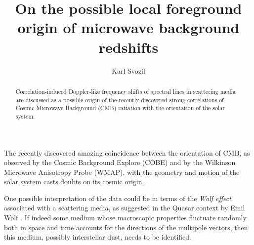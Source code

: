 \documentclass[prl,amsfonts,showpacs,showkeys]{revtex4}
\begin{document}



\title{On the possible local foreground origin of microwave background redshifts}

\author{Karl Svozil}


\begin{abstract}
Correlation-induced Doppler-like frequency shifts of spectral lines
in scattering media are discussed as a possible origin of the recently discovered strong
correlations of Cosmic Microwave Background (CMB) ratiation with the orientation of the solar system.
\end{abstract}

\maketitle

The recently discovered \cite{oliviera-cost,schwarz}
amazing coincidence between the orientation of CMB,
as observed by the Cosmic Background Explore (COBE) and by
the Wilkinson Microwave Anisotropy Probe (WMAP),
with the geometry and motion of the solar system
casts doubts on its cosmic origin.

One possible interpretation of the data could be in terms of the {\em Wolf effect}
associated with a scattering media,
as suggested in the Quasar context by Emil Wolf
\cite{Wolf-Nature-87,Wolf-PRL-87,Wolf-PRL-89,Bh-Jai}.
If indeed some medium whose macroscopic properties fluctuate randomly both in space and time
accounts for the directions of the multipole vectors, then this
medium, possibly interstellar dust, needs to be identified.



\end{document}
